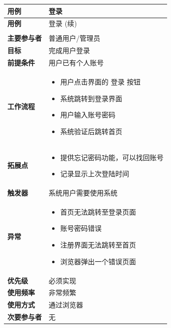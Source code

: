 \documentclass[12pt,a4paper,UTF8]{article}
\begin{document}
\begin{xltabular}{\linewidth}{|>{\raggedright\arraybackslash}p{3cm}|>{\raggedright\arraybackslash}p{8cm}|}
  \hline
  \textbf{用例} & 登录 \\ \hline 
  \endfirsthead
  
  \hline
  \textbf{用例} & 登录 (续) \\ \hline 
  \endhead
  
  \hline
   \\ 
  \endfoot

  \hline \endlastfoot

  \textbf{主要参与者} & 普通用户/管理员 \\ \hline
  \textbf{目标} & 完成用户登录 \\ \hline
  \textbf{前提条件} & 用户已有个人账号 \\ \hline
  \textbf{工作流程} & 
  \vspace{-0.5em}
  \begin{itemize}[topsep=0pt, partopsep=0pt, left=0pt, nosep]
      \item 用户点击界面的 登录 按钮
      \item 系统跳转到登录界面
      \item 用户输入账号密码
      \item 系统验证后跳转首页
  \end{itemize} \\ \hline
  \textbf{拓展点} &
  \vspace{-0.5em}
  \begin{itemize}[topsep=0pt, partopsep=0pt, left=0pt, nosep]
      \item 提供忘记密码功能，可以找回账号
      \item 记录显示上次登陆时间
  \end{itemize} \\ \hline
  \textbf{触发器} & 系统用户需要使用系统 \\ \hline
  \textbf{异常} & 
  \vspace{-0.5em}
  \begin{itemize}[topsep=0pt, partopsep=0pt, left=0pt, nosep]
      \item 首页无法跳转至登录页面
      \item 账号密码错误
      \item 注册界面无法跳转至首页
      \item 浏览器弹出一个错误页面
  \end{itemize} \\ \hline
  \textbf{优先级} & 必须实现 \\ \hline
  \textbf{使用频率} & 非常频繁 \\ \hline
  \textbf{使用方式} & 通过浏览器 \\ \hline
  \textbf{次要参与者} & 无 \\ \hline
\end{xltabular}
\end{document}
